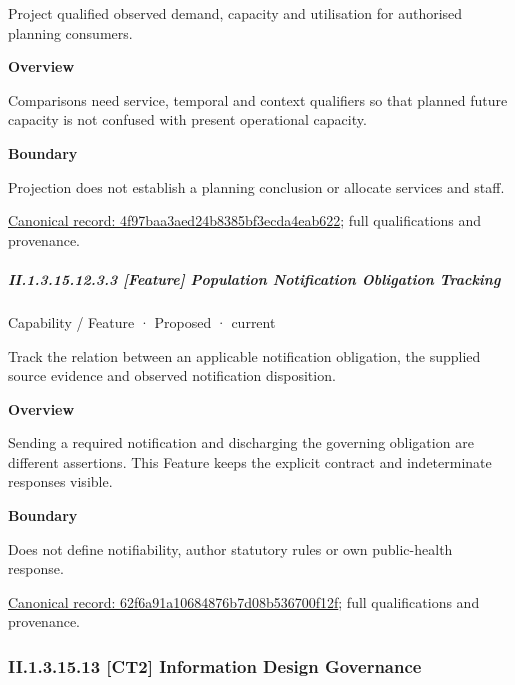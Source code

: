 Project qualified observed demand, capacity and utilisation for authorised planning consumers.



\textbf{Overview}



Comparisons need service, temporal and context qualifiers so that planned future capacity is not confused with present operational capacity.



\textbf{Boundary}



Projection does not establish a planning conclusion or allocate services and staff.


{\footnotesize \href{../../../../continuum/strategy/capability/feature/4f97baa3aed24b8385bf3ecda4eab622.md}{Canonical record: 4f97baa3aed24b8385bf3ecda4eab622}; full qualifications and provenance.}\par
\subparagraph*{II.1.3.15.12.3.3 [Feature] Population Notification Obligation Tracking}
\label{navigation:II.1.3.15.12.3.3}

\label{element:62f6a91a10684876b7d08b536700f12f}
{\small Capability / Feature · Proposed · current}\par

Track the relation between an applicable notification obligation, the supplied source evidence and observed notification disposition.



\textbf{Overview}



Sending a required notification and discharging the governing obligation are different assertions. This Feature keeps the explicit contract and indeterminate responses visible.



\textbf{Boundary}



Does not define notifiability, author statutory rules or own public-health response.


{\footnotesize \href{../../../../continuum/strategy/capability/feature/62f6a91a10684876b7d08b536700f12f.md}{Canonical record: 62f6a91a10684876b7d08b536700f12f}; full qualifications and provenance.}\par
\subsubsection*{II.1.3.15.13 [CT2] Information Design Governance}
\label{navigation:II.1.3.15.13}

